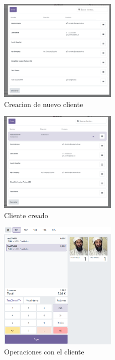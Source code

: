 \documentclass[a4paper,12pt]{article}
\begin{document}
\begin{figure}[h!]
    \centering
    \includegraphics[width=0.5\textwidth]{pr2odoo54-creacionCliente.png}
    \caption{Creacion de nuevo cliente}
\end{figure}
\FloatBarrier

\begin{figure}[h!]
    \centering
    \includegraphics[width=0.5\textwidth]{pr2odoo55-clienteCreado.png}
    \caption{Cliente creado}
\end{figure}
\FloatBarrier

\begin{figure}[h!]
    \centering
    \includegraphics[width=0.5\textwidth]{pr2odoo56-operacionesCliente101.png}
    \caption{Operaciones con el cliente}
\end{figure}
\FloatBarrier
\end{document}
